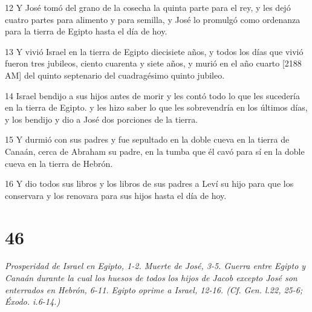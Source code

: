 \par 12 Y José tomó del grano de la cosecha la quinta parte para el rey, y les dejó cuatro partes para alimento y para semilla, y José lo promulgó como ordenanza para la tierra de Egipto hasta el día de hoy.
\par 13 Y vivió Israel en la tierra de Egipto diecisiete años, y todos los días que vivió fueron tres jubileos, ciento cuarenta y siete años, y murió en el año cuarto [2188 AM] del quinto septenario del cuadragésimo quinto jubileo.
\par 14 Israel bendijo a sus hijos antes de morir y les contó todo lo que les sucedería en la tierra de Egipto. y les hizo saber lo que les sobrevendría en los últimos días, y los bendijo y dio a José dos porciones de la tierra.
\par 15 Y durmió con sus padres y fue sepultado en la doble cueva en la tierra de Canaán, cerca de Abraham su padre, en la tumba que él cavó para sí en la doble cueva en la tierra de Hebrón.
\par 16 Y dio todos sus libros y los libros de sus padres a Leví su hijo para que los conservara y los renovara para sus hijos hasta el día de hoy.

\chapter{46}

\par \textit{Prosperidad de Israel en Egipto, 1-2. Muerte de José, 3-5. Guerra entre Egipto y Canaán durante la cual los huesos de todos los hijos de Jacob excepto José son enterrados en Hebrón, 6-11. Egipto oprime a Israel, 12-16. (Cf. Gen. l.22, 25-6; Éxodo. i.6-14.)}

